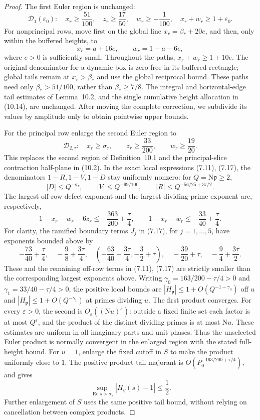 \documentclass[10pt,reqno,a4paper]{amsart}
\theoremstyle{remark}
\newcommand{\N}{\mathrm N}
\newcommand{\Rea}{\operatorname{Re}}
\newcommand{\eps}{\varepsilon}
\newcommand{\pp}{\mathfrak p}
\newcommand{\st}{\sigma_\tau}
\newcommand{\bp}{\beta_*}
\begin{document}
\begin{proof}
The first Euler region is unchanged:
\[
 \mathcal D_1(\eps_0):\quad
 x_r\ge\frac{51}{100},\quad z_r\ge\frac{17}{50},\quad
 w_r\ge-\frac1{100},\quad x_r+w_r\ge1+\eps_0.
\]
For nonprincipal rows, move first on the global line
$x_r=\bp+20e$, and then, only within the buffered heights, to
\[
                      x_r=a+16e,\qquad w_r=1-a-6e,
\]
where $e>0$ is sufficiently small. Throughout the paths,
$x_r+w_r\ge1+10e$. The original denominator for a dynamic box is
zero-free in its buffered rectangle; global tails remain at
$x_r>\bp$ and use the global reciprocal bound. These paths need
only $\bp>51/100$, rather than $\bp\ge7/8$. The integral and
horizontal-edge tail estimates of Lemma~10.2, and the single
cumulative height allocation in (10.14), are unchanged. After moving the complete correction, we subdivide its values by
amplitude only to obtain pointwise upper bounds.

For the principal row enlarge the second Euler region to
\[
 \mathcal D_{2,\tau}:\quad
 x_r\ge\st,\qquad z_r\ge\frac{33}{200},\qquad
 w_r\ge\frac{19}{20}.
\]
This replaces the second region of Definition~10.1 and the
principal-slice contraction half-plane in (10.2). In the exact
local expressions (7.11), (7.17), the denominators $1-R,1-V,1-D$
stay uniformly nonzero: for $Q=\N\pp\ge2$,
\[
 |D|\le Q^{-\st},\qquad |V|\le Q^{-99/100},\qquad
 |R|\le Q^{-56/25+3\tau/2}.
\]
The largest off-row defect exponent and the largest dividing-prime
exponent are, respectively,
\[
 1-x_r-w_r-6z_r\le-\frac{363}{200}+\frac\tau4,
 \qquad
 1-x_r-w_r\le-\frac{33}{40}+\frac\tau4.
\]
For clarity, the ramified boundary terms $J_j$ in (7.17), for
$j=1,\ldots,5$, have exponents bounded above by
\[
 -\frac{73}{40}+\frac\tau4,\quad
 -\frac98+\frac{3\tau}4,\quad
 \left(-\frac{63}{40}+\frac{3\tau}4,-\frac32+\tau\right),\quad
 -\frac{39}{20}+\tau,\quad -\frac94+\frac{3\tau}2.
\]
These and the remaining off-row terms in (7.11), (7.17) are
strictly smaller than the corresponding largest exponents above.
Writing $\gamma_0=163/200-\tau/4>0$ and
$\gamma_1=33/40-\tau/4>0$, the positive local bounds are
$|H_\pp|\le1+O(Q^{-1-\gamma_0})$ off $u$ and
$|H_\pp|\le1+O(Q^{-\gamma_1})$ at primes dividing $u$.
The first product converges. For every $\eps>0$, the second is
$O_\eps((\N u)^\eps)$: outside a fixed finite set each factor is
at most $Q^\eps$, and the product of the distinct dividing primes
is at most $\N u$. These estimates are uniform in all imaginary
parts and unit phases. Thus the unselected Euler product is normally
convergent in the enlarged region with the stated full-height bound.
For $u=1$, enlarge the fixed cutoff in $S$ to make the product
uniformly close to $1$. The positive product-tail majorant is
$O(P_0^{-163/200+\tau/4})$, and gives
\[
                 \sup_{\Rea s>\st}|H_\eta(s)-1|\le\frac12.
\]
Further enlargement of $S$ uses the same positive tail bound,
without relying on cancellation between complex products.


\end{proof}
\end{document}
